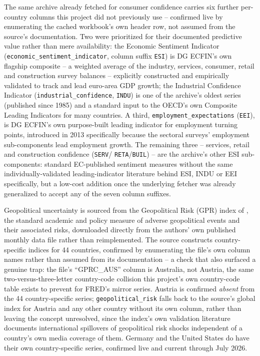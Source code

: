 \documentclass[11pt]{article}
\begin{document}
The same archive already fetched for consumer confidence carries six
further per-country columns this project did not previously use --
confirmed live by enumerating the cached workbook's own header row, not
assumed from the source's documentation. Two were prioritized for their
documented predictive value rather than mere availability: the Economic
Sentiment Indicator (\texttt{economic\_\allowbreak{}sentiment\_\allowbreak{}indicator}, column
suffix \texttt{ESI}) is DG ECFIN's own flagship composite -- a weighted
average of the industry, services, consumer, retail and construction
survey balances -- explicitly constructed and empirically validated to
track and lead euro-area GDP growth; the Industrial Confidence Indicator
(\texttt{industrial\_\allowbreak{}confidence}, \texttt{INDU}) is one of the archive's
oldest series (published since 1985) and a standard input to the OECD's
own Composite Leading Indicators for many countries. A third,
\texttt{employment\_\allowbreak{}expectations} (\texttt{EEI}), is DG ECFIN's own
purpose-built leading indicator for employment turning points,
introduced in 2013 specifically because the sectoral surveys'
employment sub-components lead employment growth. The remaining three --
services, retail and construction confidence (\texttt{SERV}/
\texttt{RETA}/\texttt{BUIL}) -- are the archive's other ESI
sub-components: standard EC-published sentiment measures without the
same individually-validated leading-indicator literature behind ESI,
INDU or EEI specifically, but a low-cost addition once the underlying
fetcher was already generalized to accept any of the seven column
suffixes.

Geopolitical uncertainty is sourced from the Geopolitical Risk (GPR)
index of \citet{caldara2022measuring}, the standard academic and policy
measure of adverse geopolitical events and their associated risks,
downloaded directly from the authors' own published monthly data file
rather than reimplemented. The source constructs country-specific
indices for 44 countries, confirmed by enumerating the file's own column
names rather than assumed from its documentation -- a check that also
surfaced a genuine trap: the file's ``GPRC\_AUS'' column is Australia,
not Austria, the same two-versus-three-letter country-code collision
this project's own country-code table exists to prevent for FRED's
mirror series. Austria is confirmed \emph{absent} from the 44
country-specific series; \texttt{geopolitical\_\allowbreak{}risk} falls back to the
source's global index for Austria and any other country without its own
column, rather than leaving the concept unresolved, since the index's
own validation literature documents international spillovers of
geopolitical risk shocks independent of a country's own media coverage
of them. Germany and the United States do have their own country-specific
series, confirmed live and current through July 2026.
\end{document}
